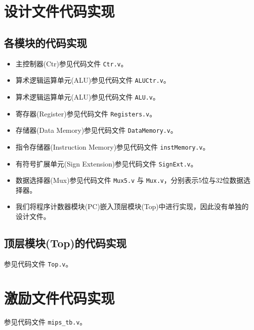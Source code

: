 \documentclass{cumcm}
\numberwithin{equation}{section}
\numberwithin{equation}{subsection}
\begin{document}
\clearpage
\begin{appendices}
\section{设计文件代码实现}\label{appsection1}
\subsection{各模块的代码实现}\label{appsection1.1}

\begin{itemize}
\item 主控制器(Ctr)参见代码文件 \texttt{Ctr.v}。
\item 算术逻辑运算单元(ALU)参见代码文件 \texttt{ALUCtr.v}。
\item 算术逻辑运算单元(ALU)参见代码文件 \texttt{ALU.v}。
\item 寄存器(Register)参见代码文件 \texttt{Registers.v}。
\item 存储器(Data Memory)参见代码文件 \texttt{DataMemory.v}。
\item 指令存储器(Instruction Memory)参见代码文件 \texttt{instMemory.v}。
\item 有符号扩展单元(Sign Extension)参见代码文件 \texttt{SignExt.v}。
\item 数据选择器(Mux)参见代码文件 \texttt{Mux5.v} 与 \texttt{Mux.v}，分别表示5位与32位数据选择器。
\item 我们将程序计数器模块(PC)嵌入顶层模块(Top)中进行实现，因此没有单独的设计文件。
\end{itemize}
\subsection{顶层模块(Top)的代码实现}\label{appsection1.2}
参见代码文件 \texttt{Top.v}。
\section{激励文件代码实现}\label{appsection2}
参见代码文件 \texttt{mips\_tb.v}。
\end{appendices}
\end{document}
